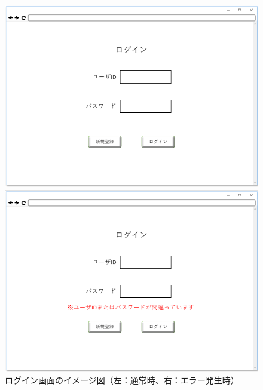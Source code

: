 \begin{figure}[htbp]
 \begin{minipage}{0.5\hsize}
  \begin{center}
   \includegraphics[width=1\linewidth,clip]{./img/01.png}
  \end{center}

 \end{minipage}
 \begin{minipage}{0.5\hsize}
  \begin{center}
   \includegraphics[width=1\linewidth,clip]{./img/02.png}
  \end{center}
 \end{minipage}
 \caption{ログイン画面のイメージ図（左：通常時、右：エラー発生時）}\label{fig:01}
\end{figure}

